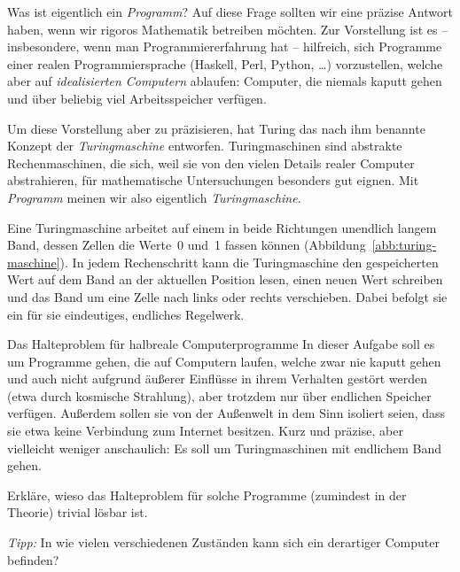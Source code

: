 \documentclass[twoside]{../zirkelblatt1415}
\theoremstyle{definition}
\theoremstyle{plain}
\theoremstyle{remark}
\begin{document}
Was ist eigentlich ein \emph{Programm}? Auf diese Frage sollten wir eine
präzise Antwort haben, wenn wir rigoros Mathematik betreiben möchten. Zur
Vorstellung ist es -- insbesondere, wenn man Programmiererfahrung hat --
hilfreich, sich Programme einer realen Programmiersprache (Haskell, Perl,
Python, \ldots) vorzustellen, welche aber auf \emph{idealisierten Computern}
ablaufen: Computer, die niemals kaputt gehen und über beliebig viel
Arbeitsspeicher verfügen.

Um diese Vorstellung aber zu präzisieren, hat Turing das nach ihm benannte
Konzept der \emph{Turingmaschine} entworfen. Turingmaschinen sind abstrakte
Rechenmaschinen, die sich, weil sie von den vielen Details realer Computer
abstrahieren, für mathematische Untersuchungen besonders gut eignen. Mit
\emph{Programm} meinen wir also eigentlich \emph{Turingmaschine}.

Eine Turingmaschine arbeitet auf einem in beide Richtungen unendlich langem
Band, dessen Zellen die Werte~0 und~1 fassen können
(Abbildung~\ref{abb:turing-maschine}).  In jedem Rechenschritt kann die
Turingmaschine den gespeicherten Wert auf dem Band an der aktuellen Position
lesen, einen neuen Wert schreiben und das Band um eine Zelle nach links oder
rechts verschieben. Dabei befolgt sie ein für sie eindeutiges, endliches
Regelwerk.

\begin{aufgabeShaded}{Das Halteproblem für halbreale Computerprogramme}
In dieser Aufgabe soll es um Programme gehen, die auf Computern laufen, welche
zwar nie kaputt gehen und auch nicht aufgrund äußerer Einflüsse in ihrem
Verhalten gestört werden (etwa durch kosmische Strahlung), aber trotzdem nur
über endlichen Speicher verfügen. Außerdem sollen sie von der Außenwelt in dem
Sinn isoliert seien, dass sie etwa keine Verbindung zum Internet besitzen.
Kurz und präzise, aber vielleicht weniger anschaulich: Es soll um
Turingmaschinen mit endlichem Band gehen.

Erkläre, wieso das Halteproblem für solche Programme (zumindest in der
Theorie) trivial lösbar ist.

\emph{Tipp:} In wie vielen verschiedenen Zuständen kann sich ein derartiger
Computer befinden?
\end{aufgabeShaded}
\end{document}
